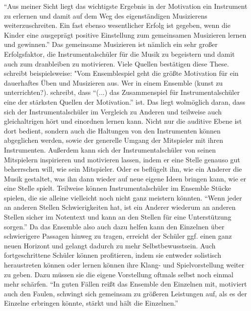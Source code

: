\enquote{Aus meiner Sicht liegt das wichtigste Ergebnis in der Motivation ein Instrument
zu erlernen und damit auf dem Weg des eigenständigen Musizierens
weiterzuschreiten. Ein fast ebenso wesentlicher Erfolg ist gegeben, wenn die
Kinder eine ausgeprägt positive Einstellung zum gemeinsamen Musizieren lernen
und gewinnen.}\autocite[40]{ernst:die_zukunftsfaehige_musikschule} Das
gemeinsame Musizieren ist nämlich ein sehr großer Erfolgsfaktor, die
Instrumentalschüler für die Musik zu begeistern und damit auch zum dranbleiben
zu motivieren. Viele Quellen bestätigen diese These. %
schreibt beispielsweise: "Vom Ensemblespiel geht die größte Motivation für ein
dauerhaftes Üben und Musizieren aus. Wer in einem Ensemble (kunst zu
unterrichten?). %
schreibt, dass \enquote{(...) das Zusammenspiel für Instrumentalschüler eine der
stärksten Quellen der Motivation.} ist.  %
Das liegt wolmöglich daran, dass sich der Instrumentalschüler im Vergleich zu
Anderen und teilweise auch gleichaltrigen hört und einordnen lernen kann. Nicht
nur die auditive Ebene ist dort bedient, sondern auch die Haltungen von den
Instrumenten können abgeglichen werden, sowie der generelle Umgang der
Mitspieler mit ihren Instrumenten. Außerdem kann sich der Instrumentalschüler
von seinen Mitspielern inspirieren und motivieren lassen, indem er eine Stelle
genauso gut beherrschen will, wie sein Mitspieler. Oder es beflügelt ihn, wie
ein Anderer die Musik gestaltet, was ihn dann wieder auf neue eigene Ideen
bringen kann, wie er eine Stelle spielt. Teilweise können Instrumentalschüler im
Ensemble Stücke spielen, die sie alleine vielleicht noch nicht ganz meistern
könnten. \enquote{Wenn jeder an anderen Stellen Schwierigkeiten hat, ist ein Anderer
wiederum an anderen Stellen sicher im Notentext und kann an den Stellen für eine
Unterstützung sorgen.}
\autocite[32]{losert:die_kunst_zu_unterrichten}
Da das Ensemble also auch dazu helfen kann den Einzelnen über schwierigere
Passagen hinweg zu tragen, erreicht der Schüler ggf. einen ganz neuen Horizont
und gelangt dadurch zu mehr Selbstbewusstsein. Auch fortgeschrittene
Schüler können profitieren, indem sie entweder solistisch heraustreten können
oder lernen können ihre Klang- und Spielvorstellung weiter zu geben. Dazu müssen
sie die eigene Vorstellung oftmals selbst noch einmal mehr schärfen. \enquote{In guten
Fällen reißt das Ensemble den Einzelnen mit, motiviert auch den Faulen, schwingt
sich gemeinsam zu größeren Leistungen auf, als es der Einzelne erbringen könnte,
stärkt und hält die Einzelnen.} \autocite[94]{mitzscherlich:musikpsychologie}

